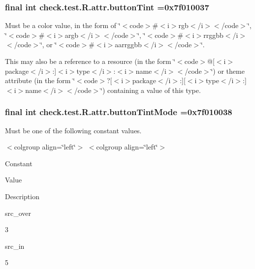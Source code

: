 \subsubsection[{button\+Tint}]{\setlength{\rightskip}{0pt plus 5cm}final int check.\+test.\+R.\+attr.\+button\+Tint =0x7f010037\hspace{0.3cm}{\ttfamily [static]}}\label{classcheck_1_1test_1_1_r_1_1attr_ae0edaceba06f9362a37080dd1f7d7822}
Must be a color value, in the form of \char`\"{}$<$code$>$\#$<$i$>$rgb$<$/i$>$$<$/code$>$\char`\"{}, \char`\"{}$<$code$>$\#$<$i$>$argb$<$/i$>$$<$/code$>$\char`\"{}, \char`\"{}$<$code$>$\#$<$i$>$rrggbb$<$/i$>$$<$/code$>$\char`\"{}, or \char`\"{}$<$code$>$\#$<$i$>$aarrggbb$<$/i$>$$<$/code$>$\char`\"{}. 

This may also be a reference to a resource (in the form \char`\"{}$<$code$>$@\mbox{[}$<$i$>$package$<$/i$>$\+:\mbox{]}$<$i$>$type$<$/i$>$\+:$<$i$>$name$<$/i$>$$<$/code$>$\char`\"{}) or theme attribute (in the form \char`\"{}$<$code$>$?\mbox{[}$<$i$>$package$<$/i$>$\+:\mbox{]}\mbox{[}$<$i$>$type$<$/i$>$\+:\mbox{]}$<$i$>$name$<$/i$>$$<$/code$>$\char`\"{}) containing a value of this type. \hypertarget{classcheck_1_1test_1_1_r_1_1attr_ac70c44b347889c97d7002237d7a591d3}{}
\subsubsection[{button\+Tint\+Mode}]{\setlength{\rightskip}{0pt plus 5cm}final int check.\+test.\+R.\+attr.\+button\+Tint\+Mode =0x7f010038\hspace{0.3cm}{\ttfamily [static]}}\label{classcheck_1_1test_1_1_r_1_1attr_ac70c44b347889c97d7002237d7a591d3}
Must be one of the following constant values.

\begin{TabularC}{0}
\hline
\end{TabularC}
$<$colgroup align=\char`\"{}left\char`\"{}$>$ $<$colgroup align=\char`\"{}left\char`\"{}$>$ 

Constant

Value

Description 

{\ttfamily src\+\_\+over}

3

{\ttfamily src\+\_\+in}

5

